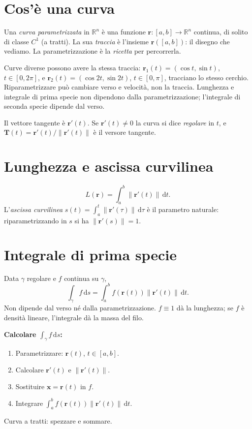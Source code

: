 \documentclass[11pt,a4paper,openany]{book}
\theoremstyle{plain}
\theoremstyle{definition}
\theoremstyle{remark}
\newcommand{\R}{\mathbb{R}}
\newcommand{\dd}{\,\mathrm{d}}
\renewcommand{\vec}[1]{\mathbf{#1}}
\newcommand{\rr}{\mathbf{r}}
\newcommand{\TT}{\mathbf{T}}
\newcommand{\norm}[1]{\left\lVert #1 \right\rVert}
\begin{document}
\section{Cos'\`e una curva}

Una \emph{curva parametrizzata} in $\R^n$ \`e una funzione $\rr:[a,b]\to\R^n$
continua, di solito di classe $C^1$ (a tratti). La sua \emph{traccia} \`e
l'insieme $\rr([a,b])$: il disegno che vediamo. La parametrizzazione \`e la
\emph{ricetta} per percorrerla.

\begin{nota}
Curve diverse possono avere la stessa traccia: $\rr_1(t)=(\cos t,\sin t)$,
$t\in[0,2\pi]$, e $\rr_2(t)=(\cos 2t,\sin 2t)$, $t\in[0,\pi]$, tracciano lo
stesso cerchio. Riparametrizzare pu\`o cambiare verso e velocit\`a, non la
traccia. Lunghezza e integrale di prima specie non dipendono dalla
parametrizzazione; l'integrale di seconda specie dipende dal verso.
\end{nota}

Il vettore tangente \`e $\rr'(t)$. Se $\rr'(t)\ne 0$ la curva si dice
\emph{regolare} in $t$, e $\TT(t)=\rr'(t)/\norm{\rr'(t)}$ \`e il versore
tangente.

\section{Lunghezza e ascissa curvilinea}

\begin{equation}
  L(\rr)=\int_a^b \norm{\rr'(t)}\dd t.
  \label{eq:lungh}
\end{equation}
L'\emph{ascissa curvilinea} $s(t)=\int_a^t\norm{\rr'(\tau)}\dd\tau$ \`e il
parametro naturale: riparametrizzando in $s$ si ha $\norm{\rr'(s)}=1$.

\section{Integrale di prima specie}

Data $\gamma$ regolare e $f$ continua su $\gamma$,
\begin{equation}
  \int_\gamma f\dd s=\int_a^b f(\rr(t))\norm{\rr'(t)}\dd t.
  \label{eq:int-prima}
\end{equation}
Non dipende dal verso n\'e dalla parametrizzazione. $f\equiv 1$ d\`a la
lunghezza; se $f$ \`e densit\`a lineare, l'integrale d\`a la massa del filo.

\begin{ricetta}
\textbf{Calcolare $\int_\gamma f\dd s$:}
\begin{enumerate}[leftmargin=*]
  \item Parametrizzare: $\rr(t)$, $t\in[a,b]$.
  \item Calcolare $\rr'(t)$ e $\norm{\rr'(t)}$.
  \item Sostituire $\vec{x}=\rr(t)$ in $f$.
  \item Integrare $\int_a^b f(\rr(t))\norm{\rr'(t)}\dd t$.
\end{enumerate}
Curva a tratti: spezzare e sommare.
\end{ricetta}
\end{document}
